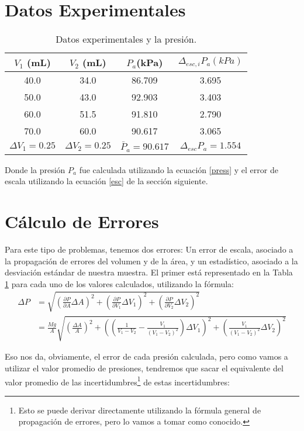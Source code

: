 \documentclass[a4paper,12pt]{article}
\begin{document}
\section{Datos Experimentales}


\begin{table}
  \centering
  \caption{Datos experimentales y la presión.}
  \label{data}
    \begin{tabular}{|c|c|c|c|}
    \hline
    $V_{1}$ (mL) & $V_{2}$ (mL)&  $P_{a}$(kPa)& $\Delta_{esc,i} P_a (kPa)$\\
    \hline
    40.0 & 34.0 & 86.709 & 3.695 \\ \hline
    50.0 & 43.0 & 92.903 & 3.403 \\ \hline
    60.0 & 51.5 & 91.810 & 2.790 \\ \hline
    70.0 & 60.0 & 90.617 & 3.065 \\ \hline
     $\Delta V_1 =0.25$ & $\Delta V_{2} =0.25$ & $\bar{P}_{a} = 90.617$ & $\Delta_{esc} P_a = 1.554$ \\ \hline
    \end{tabular}
\end{table}
Donde la presión $P_{a}$ fue calculada utilizando la ecuación \eqref{press} y el error de escala utilizando la ecuación \eqref{esc} de la sección siguiente.

\section{Cálculo de Errores}
Para este tipo de problemas, tenemos dos errores: Un error de escala, asociado a la propagación de errores del volumen y de la área, y un estadístico, asociado a la desviación estándar de nuestra muestra. El primer está representado en la Tabla \ref{data} para cada uno de los valores calculados, utilizando la fórmula:
\begin{align}
  \label{esc}
  \Delta P &= \sqrt{\left(\frac{\partial P}{\partial A} \Delta A\right)^2 + \left(\frac{\partial P}{\partial V_1} \Delta V_1\right)^2 + \left(\frac{\partial P}{\partial V_2} \Delta V_2\right)^2}\\ &= \frac{Mg}{A}\sqrt{\left(\frac{\Delta A}{A}\right)^2 + \left(\left(\frac{1}{V_1-V_2} - \frac{V_1}{(V_1-V_2)^2}\right)\Delta V_1\right)^2 + \left(\frac{V_1}{\left(V_1-V_2\right)^2} \Delta V_2\right)^2}
\end{align}


Eso nos da, obviamente, el error de cada presión calculada, pero como vamos a utilizar el valor promedio de presiones, tendremos que sacar el equivalente del valor promedio de las incertidumbres\footnote{Esto se puede derivar directamente utilizando la fórmula general de propagación de errores, pero lo vamos a tomar como conocido.} de estas incertidumbres:
\end{document}
